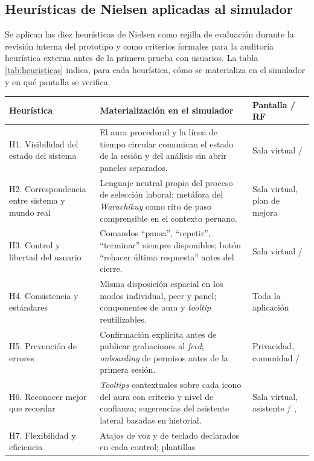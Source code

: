 \subsection{Heurísticas de Nielsen aplicadas al simulador}

Se aplican las diez heurísticas de Nielsen como rejilla de evaluación
durante la revisión interna del prototipo y como criterios formales
para la auditoría heurística externa antes de la primera prueba con
usuarios. La tabla \ref{tab:heuristicas} indica, para cada heurística,
cómo se materializa en el simulador y en qué pantalla se verifica.

\begin{table}[ht]
\centering
\renewcommand{\arraystretch}{1.25}
\footnotesize
\begin{tabularx}{\linewidth}{@{}p{4.5cm} Y l@{}}
\toprule
\textbf{Heurística} & \textbf{Materialización en el simulador} &
\textbf{Pantalla / RF} \\
\midrule
H1. Visibilidad del estado del sistema &
El aura procedural y la línea de tiempo circular comunican el estado
de la sesión y del análisis sin abrir paneles separados. &
Sala virtual /  \\
\addlinespace
H2. Correspondencia entre sistema y mundo real &
Lenguaje neutral propio del proceso de selección laboral; metáfora
del \textit{Warachikuy} como rito de paso comprensible en el contexto
peruano. &
Sala virtual, plan de mejora \\
\addlinespace
H3. Control y libertad del usuario &
Comandos ``pausa'', ``repetir'', ``terminar'' siempre disponibles;
botón ``rehacer última respuesta'' antes del cierre. &
Sala virtual /  \\
\addlinespace
H4. Consistencia y estándares &
Misma disposición espacial en los modos individual, peer y panel;
componentes de aura y \textit{tooltip} reutilizables. &
Toda la aplicación \\
\addlinespace
H5. Prevención de errores &
Confirmación explícita antes de publicar grabaciones al \textit{feed};
\textit{onboarding} de permisos antes de la primera sesión. &
Privacidad, comunidad /  \\
\addlinespace
H6. Reconocer mejor que recordar &
\textit{Tooltips} contextuales sobre cada icono del aura con criterio
y nivel de confianza; sugerencias del asistente lateral basadas en
historial. &
Sala virtual, asistente / ,  \\
\addlinespace
H7. Flexibilidad y eficiencia &
Atajos de voz y de teclado declarados en cada control; plantillas

\end{tabularx}
\end{table}

